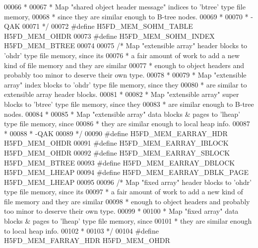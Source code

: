 \begin{DoxyCode}
00066 \textcolor{comment}{ *}
00067 \textcolor{comment}{ * Map "shared object header message" indices to 'btree' type file memory,}
00068 \textcolor{comment}{ * since they are similar enough to B-tree nodes.}
00069 \textcolor{comment}{ *}
00070 \textcolor{comment}{ *      -QAK}
00071 \textcolor{comment}{ */}
00072 \textcolor{preprocessor}{#define H5FD\_MEM\_SOHM\_TABLE     H5FD\_MEM\_OHDR}
00073 \textcolor{preprocessor}{#define H5FD\_MEM\_SOHM\_INDEX     H5FD\_MEM\_BTREE}
00074 
00075 \textcolor{comment}{/* Map "extensible array" header blocks to 'ohdr' type file memory, since its}
00076 \textcolor{comment}{ * a fair amount of work to add a new kind of file memory and they are similar}
00077 \textcolor{comment}{ * enough to object headers and probably too minor to deserve their own type.}
00078 \textcolor{comment}{ *}
00079 \textcolor{comment}{ * Map "extensible array" index blocks to 'ohdr' type file memory, since they}
00080 \textcolor{comment}{ * are similar to extensible array header blocks.}
00081 \textcolor{comment}{ *}
00082 \textcolor{comment}{ * Map "extensible array" super blocks to 'btree' type file memory, since they}
00083 \textcolor{comment}{ * are similar enough to B-tree nodes.}
00084 \textcolor{comment}{ *}
00085 \textcolor{comment}{ * Map "extensible array" data blocks & pages to 'lheap' type file memory, since}
00086 \textcolor{comment}{ * they are similar enough to local heap info.}
00087 \textcolor{comment}{ *}
00088 \textcolor{comment}{ *      -QAK}
00089 \textcolor{comment}{ */}
00090 \textcolor{preprocessor}{#define H5FD\_MEM\_EARRAY\_HDR     H5FD\_MEM\_OHDR}
00091 \textcolor{preprocessor}{#define H5FD\_MEM\_EARRAY\_IBLOCK  H5FD\_MEM\_OHDR}
00092 \textcolor{preprocessor}{#define H5FD\_MEM\_EARRAY\_SBLOCK  H5FD\_MEM\_BTREE}
00093 \textcolor{preprocessor}{#define H5FD\_MEM\_EARRAY\_DBLOCK  H5FD\_MEM\_LHEAP}
00094 \textcolor{preprocessor}{#define H5FD\_MEM\_EARRAY\_DBLK\_PAGE  H5FD\_MEM\_LHEAP}
00095 
00096 \textcolor{comment}{/* Map "fixed array" header blocks to 'ohdr' type file memory, since its}
00097 \textcolor{comment}{ * a fair amount of work to add a new kind of file memory and they are similar}
00098 \textcolor{comment}{ * enough to object headers and probably too minor to deserve their own type.}
00099 \textcolor{comment}{ *}
00100 \textcolor{comment}{ * Map "fixed array" data blocks & pages to 'lheap' type file memory, since}
00101 \textcolor{comment}{ * they are similar enough to local heap info.}
00102 \textcolor{comment}{ *}
00103 \textcolor{comment}{ */}
00104 \textcolor{preprocessor}{#define H5FD\_MEM\_FARRAY\_HDR     H5FD\_MEM\_OHDR}

\end{DoxyCode}
